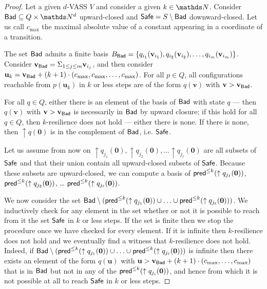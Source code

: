 \begin{proof}
Let a given $d$-VASS $V$ and consider a given $k \in \N$.
Consider $\Bad \subseteq Q \times \N^d$ upward-closed and 
$\textsf{Safe} = S \setminus \textsf{Bad}$
 downward-closed.
Let us call $c_{\max}$ the maximal absolute value of a constant appearing in a coordinate of a transition.

The set $\textsf{Bad}$ admits a finite basis 
$B_{\textsf{Bad}} = \{ q_{i_1}(\textbf{v}_{i_1}), q_{i_2}(\textbf{v}_{i_2}), \ldots,
q_{i_m}(\textbf{v}_{i_m}) \}$.
Consider $\textbf{v}_{\textsf{Bad}} = \Sigma_{1 \leq j \leq m} \textbf{v}_{i_j}$,
and then consider 
$\textbf{u}_k = \textbf{v}_{\textsf{Bad}} + (k+1) \cdot (c_{\max}, c_{\max}, \ldots, c_{\max})$.
For all $p \in Q$, all configurations reachable from $p(\textbf{u}_k)$ in $k$ or less steps are 
of the form $q(\textbf{v})$ with $ \textbf{v} > \textbf{v}_{\textsf{Bad}}$.

For all $q \in Q$, either there is an element of the basis of $\textsf{Bad}$ with state $q$ \----
then $q(\textbf{v})$ with $\textbf{v} > \textbf{v}_{\textsf{Bad}}$ is necessarily in $\textsf{Bad}$ by upward closure; if this hold for all $q \in Q$, then $k$-resilience does not hold \---- either there is none. If there is none, then 
$\uparrow q(\textbf{0})$
 is in the complement of $\textsf{Bad}$, i.e. $\textsf{Safe}$.

Let us assume from now on 
 $\uparrow q_{j_1}(\textbf{0}), \uparrow q_{j_2}(\textbf{0}), \ldots \uparrow q_{j_\ell}(\textbf{0})$ are
all subsets of $\textsf{Safe}$ and that their union contain all upward-closed subsets of $\textsf{Safe}$.
Because these subsets are upward-closed, we can compute a basis of
$\textsf{pred}^{\leq k}(\uparrow q_{j_1}(\textbf{0}))$, $\textsf{pred}^{\leq k}(\uparrow q_{j_2}(\textbf{0}))$, \ldots
$\textsf{pred}^{\leq k}(\uparrow q_{j_\ell}(\textbf{0}))$.


We now consider the set 
$\textsf{Bad} \setminus (\textsf{pred}^{\leq k}(\uparrow q_{j_1}(\textbf{0})) \cup \ldots \cup \textsf{pred}^{\leq k}(\uparrow q_{j_\ell}(\textbf{0})) )$.
We inductively check for any element in the set whether or not it is possible to reach from it the set $\textsf{Safe}$ in $k$ or less steps.
If the set is finite then we stop the procedure once we have checked for every element.
If it is infinite then
$k$-resilience does not hold 
and we eventually find a witness that $k$-resilience does not hold.
Indeed, 
if
$\textsf{Bad} \setminus (\textsf{pred}^{\leq k}(\uparrow q_{j_1}(\textbf{0})) \cup \ldots \cup \textsf{pred}^{\leq k}(\uparrow q_{j_\ell}(\textbf{0})) )$
is
infinite
then
there exists an element of the form $q(\textbf{u} )$
with $\textbf{u} > \textbf{v}_{\textsf{Bad}} + (k+1) \cdot (c_{\max}, \ldots, c_{\max})$ 
that is in $\textsf{Bad}$ but not in any of the $\textsf{pred}^{\leq k}(\uparrow q_{j_i}(\textbf{0}))$,
and hence from which it is not possible at all to reach
$\textsf{Safe}$ in $k$ or less steps.
\end{proof}


